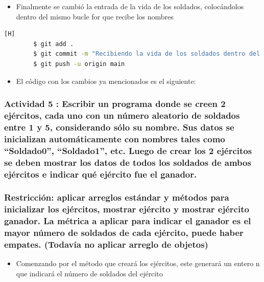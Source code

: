 \documentclass{article}
\begin{document}
    \begin{itemize}
        \item Finalmente se cambió la entrada de la vida de los soldados, colocándolos dentro del mismo bucle for que recibe los nombres
    \end{itemize}
    
    \begin{lstlisting}[language=bash,caption={Commit: Recibiendo la vida de los soldados dentro del mismo bucle que los nombres para reducir código}][H]
		$ git add .
		$ git commit -m "Recibiendo la vida de los soldados dentro del mismo bucle que los nombres para reducir código"			
		$ git push -u origin main
	\end{lstlisting}

    \begin{itemize}
        \item El código con los cambios ya mencionados es el siguiente: 
    \end{itemize} 
	


    \subsubsection{Actividad 5 : Escribir un programa donde se creen 2 ejércitos, cada uno con un número aleatorio de soldados entre 1 y 5, considerando sólo su nombre. Sus datos se inicializan automáticamente con nombres tales como “Soldado0”, “Soldado1”, etc. Luego de crear los 2 ejércitos se deben mostrar los datos de todos los soldados de ambos ejércitos e indicar qué ejército fue el ganador. \\\\
    \color{red}Restricción: aplicar arreglos estándar y métodos para inicializar los ejércitos, mostrar ejército y mostrar ejército ganador. La métrica a aplicar para indicar el ganador es el mayor número de soldados de cada ejército, puede haber empates. (Todavía no aplicar arreglo de objetos)}

    \begin{itemize}
        \item Comenzando por el método que creará los ejércitos, este generará un entero n que indicará el número de soldados del ejército
    \end{itemize}    
    
\end{document}

